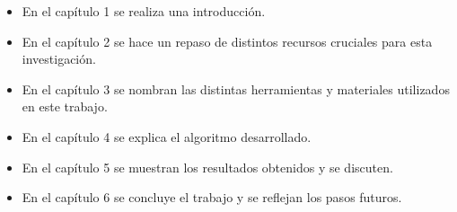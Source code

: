 \begin{itemize}
\item En el capítulo 1 se realiza una introducción.
\item En el capítulo 2 se hace un repaso de distintos recursos cruciales para esta investigación.
\item En el capítulo 3 se nombran las distintas herramientas y materiales utilizados en este trabajo.
\item En el capítulo 4 se explica el algoritmo desarrollado. 
\item En el capítulo 5 se muestran los resultados obtenidos y se discuten.
\item En el capítulo 6 se concluye el trabajo y se reflejan los pasos futuros.
\end{itemize}
